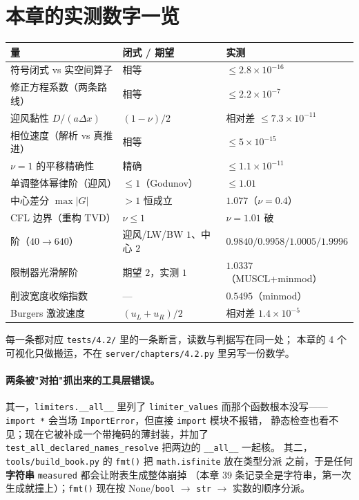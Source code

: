 \section{本章的实测数字一览}

\begin{center}
\begin{tabular}{lll}
\hline
量 & 闭式 / 期望 & 实测\\
\hline
符号闭式 vs 实空间算子 & 相等 & $\le2.8\times10^{-16}$\\
修正方程系数（两条路线） & 相等 & $\le2.2\times10^{-7}$\\
迎风黏性 $D/(a\Delta x)$ & $(1-\nu)/2$ & 相对差 $\le7.3\times10^{-11}$\\
相位速度（解析 vs 真推进） & 相等 & $\le5\times10^{-15}$\\
$\nu=1$ 的平移精确性 & 精确 & $\le1.1\times10^{-11}$\\
单调整体幂律阶（迎风） & $\le1$（Godunov） & $\le1.01$\\
中心差分 $\max|G|$ & $>1$ 恒成立 & $1.077$（$\nu=0.4$）\\
CFL 边界（重构 TVD） & $\nu\le1$ & $\nu=1.01$ 破\\
阶（$40\to640$） & 迎风/LW/BW $1$、中心 $2$ & $0.9840/0.9958/1.0005/1.9996$\\
限制器光滑解阶 & 期望 $2$，实测 $1$ & $1.0337$（MUSCL+minmod）\\
削波宽度收缩指数 & — & $0.5495$（minmod）\\
Burgers 激波速度 & $(u_L+u_R)/2$ & 相对差 $1.4\times10^{-5}$\\
\hline
\end{tabular}
\end{center}

每一条都对应 \texttt{tests/4.2/} 里的一条断言，读数与判据写在同一处；
本章的 4 个可视化只做搬运，不在 \texttt{server/chapters/4.2.py} 里另写一份数学。

\paragraph{两条被"对拍"抓出来的工具层错误。}
其一，\texttt{limiters.\_\_all\_\_} 里列了 \texttt{limiter\_values} 而那个函数根本没写——
\texttt{import *} 会当场 \texttt{ImportError}，但直接 \texttt{import} 模块不报错，
静态检查也看不见；现在它被补成一个带掩码的薄封装，并加了
\texttt{test\_all\_declared\_names\_resolve} 把两边的 \texttt{\_\_all\_\_} 一起核。
其二，\texttt{tools/build\_book.py} 的 \texttt{fmt()} 把 \texttt{math.isfinite} 放在类型分派
之前，于是任何\textbf{字符串} \texttt{measured} 都会让附表生成整体崩掉
（本章 39 条记录全是字符串，第一次生成就撞上）；\texttt{fmt()} 现在按
None/\texttt{bool} $\to$ \texttt{str} $\to$ 实数的顺序分派。


